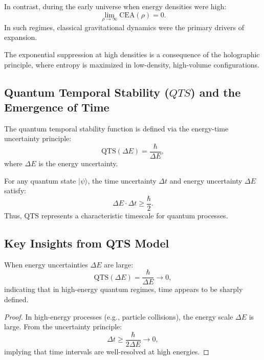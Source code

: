 \begin{proposition}
In contrast, during the early universe when energy densities were high:
\[
\lim_{\rho \to \infty} \text{CEA}(\rho) = 0.
\]
In such regimes, classical gravitational dynamics were the primary drivers of expansion.
\end{proposition}

\begin{remark}
The exponential suppression at high densities is a consequence of the holographic principle, where entropy is maximized in low-density, high-volume configurations.
\end{remark}

\subsection{Quantum Temporal Stability ($QTS$) and the Emergence of Time}

\begin{definition}
The quantum temporal stability function is defined via the energy-time uncertainty principle:
\[
\text{QTS}(\Delta E) = \frac{\hbar}{\Delta E},
\]
where $\Delta E$ is the energy uncertainty.
\end{definition}

\begin{theorem}
For any quantum state $|\psi\rangle$, the time uncertainty $\Delta t$ and energy uncertainty $\Delta E$ satisfy:
\[
\Delta E \cdot \Delta t \geq \frac{\hbar}{2}.
\]
Thus, $\text{QTS}$ represents a characteristic timescale for quantum processes.
\end{theorem}

\subsection{Key Insights from QTS Model}

\begin{proposition}
When energy uncertainties $\Delta E$ are large:
\[
\text{QTS}(\Delta E) = \frac{\hbar}{\Delta E} \to 0,
\]
indicating that in high-energy quantum regimes, time appears to be sharply defined.
\end{proposition}

\begin{proof}
In high-energy processes (e.g., particle collisions), the energy scale $\Delta E$ is large. From the uncertainty principle:
\[
\Delta t \geq \frac{\hbar}{2\Delta E} \to 0,
\]
implying that time intervals are well-resolved at high energies.
\end{proof}

